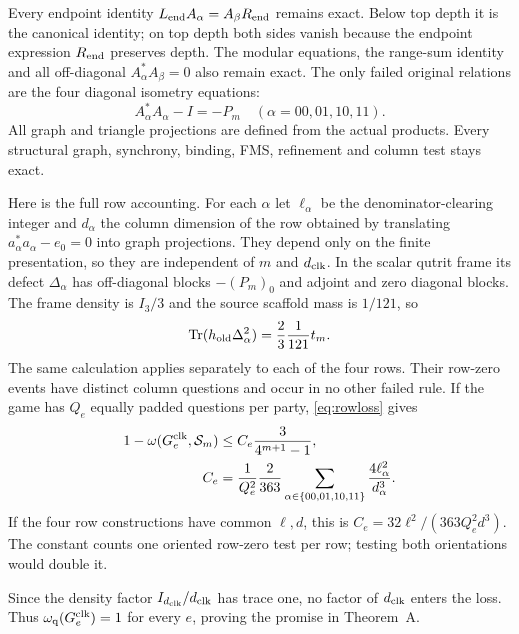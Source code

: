 Every endpoint identity $L_{\rm end}A_\alpha=A_\beta R_{\rm end}$ remains exact. Below top depth it is the canonical identity; on top depth both sides vanish because the endpoint expression $R_{\rm end}$ preserves depth. The modular equations, the range-sum identity and all off-diagonal $A_\alpha^*A_\beta=0$ also remain exact. The only failed original relations are the four diagonal isometry equations:
\begin{equation}\label{eq:fourdefects}
 A_\alpha^*A_\alpha-I=-P_m\quad(\alpha=00,01,10,11).
\end{equation}
All graph and triangle projections are defined from the actual products. Every structural graph, synchrony, binding, FMS, refinement and column test stays exact.

Here is the full row accounting. For each $\alpha$ let $\ell_\alpha$ be the denominator-clearing integer and $d_\alpha$ the column dimension of the row obtained by translating $a_\alpha^*a_\alpha-e_0=0$ into graph projections. They depend only on the finite presentation, so they are independent of $m$ and ${d_{\rm clk}}$. In the scalar qutrit frame its defect $\Delta_\alpha$ has off-diagonal blocks $-(P_m)_0$ and adjoint and zero diagonal blocks. The frame density is $I_3/3$ and the source scaffold mass is $1/121$, so
\begin{equation}\label{eq:defectweight}
 \operatorname{Tr}(h_{\rm old}\Delta_\alpha^2)=\frac23\frac1{121}t_m.
\end{equation}
The same calculation applies separately to each of the four rows. Their row-zero events have distinct column questions and occur in no other failed rule. If the game has $Q_e$ equally padded questions per party, \eqref{eq:rowloss} gives
\begin{align}
 1-\omega(G^{\rm clk}_e,\mathcal S_m)
 &\leq C_e\frac{3}{4^{m+1}-1},\label{eq:valueloss}\\
 C_e&=\frac{1}{Q_e^2}\frac{2}{363}
 \sum_{\alpha\in\{00,01,10,11\}}\frac{4\ell_\alpha^2}{d_\alpha^3}.\label{eq:valueconstant}
\end{align}
If the four row constructions have common $\ell,d$, this is $C_e=32\ell^2/(363Q_e^2d^3)$. The constant counts one oriented row-zero test per row; testing both orientations would double it.

Since the density factor $I_{d_{\rm clk}}/{d_{\rm clk}}$ has trace one, no factor of ${d_{\rm clk}}$ enters the loss. Thus $\omega_{\mathrm{q}}(G^{\rm clk}_e)=1$ for every $e$, proving the promise in Theorem~A.
